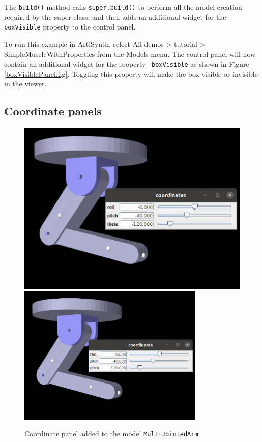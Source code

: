 The {\tt build()} method calls {\tt super.build()} to perform all the
model creation required by the super class, and then adds an
additional widget for the {\tt boxVisible} property to the control
panel.

To run this example in ArtiSynth, select {\sf All demos > tutorial >
SimpleMuscleWithProperties} from the {\sf Models} menu. The control
panel will now contain an additional widget for the property {\tt
boxVisible} as shown in Figure \ref{boxVisiblePanel:fig}. Toggling
this property will make the box visible or invisible in the viewer.

\subsection{Coordinate panels}

\begin{figure}[ht]
\begin{center}
\iflatexml
 \includegraphics[]{images/CoordinatePanel}
\else
 \includegraphics[width=3.5in]{images/CoordinatePanel}
\fi
\end{center}
\caption{Coordinate panel added to the model {\tt MultiJointedArm}.}
\label{CoordinatePanel:fig}
\end{figure}

